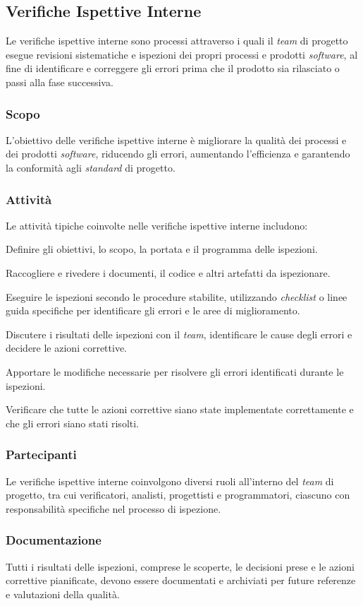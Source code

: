 \subsection{Verifiche Ispettive Interne}

Le verifiche ispettive interne sono processi attraverso i quali il \textit{team} di
progetto esegue revisioni sistematiche e ispezioni dei propri processi e
prodotti \textit{software}, al fine di identificare e correggere gli errori
prima che il prodotto sia rilasciato o passi alla fase successiva.

\subsubsection{Scopo}
L'obiettivo delle verifiche ispettive interne è migliorare la qualità dei
processi e dei prodotti \textit{software}, riducendo gli errori, aumentando
l'efficienza e garantendo la conformità agli \textit{standard} di progetto.

\subsubsection{Attività}
Le attività tipiche coinvolte nelle verifiche ispettive interne includono:

Definire gli obiettivi, lo
	  scopo, la portata e il programma delle ispezioni.

Raccogliere e rivedere i documenti, il codice e
	  altri artefatti da ispezionare.

Eseguire le ispezioni secondo le
	  procedure stabilite, utilizzando \textit{checklist} o linee guida
	  specifiche per identificare gli errori e le aree di miglioramento.

Discutere i risultati delle ispezioni
	  con il \textit{team}, identificare le cause degli errori e decidere le azioni
	  correttive.

Apportare le
	  modifiche necessarie per risolvere gli errori identificati durante le
	  ispezioni.

Verificare che tutte le azioni
	  correttive siano state implementate correttamente e che gli errori
	  siano stati risolti.

\subsubsection{Partecipanti}
Le verifiche ispettive interne coinvolgono diversi ruoli all'interno del \textit{team}
di progetto, tra cui verificatori, analisti, progettisti e programmatori,
ciascuno con responsabilità specifiche nel processo di ispezione.

\subsubsection{Documentazione}
Tutti i risultati delle ispezioni, comprese le scoperte, le decisioni prese e
le azioni correttive pianificate, devono essere documentati e archiviati per
future referenze e valutazioni della qualità.
